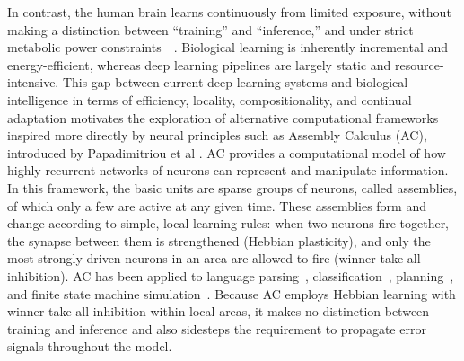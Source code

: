 In contrast, the human brain learns continuously from limited exposure, without making a distinction between “training” and “inference,” and under strict metabolic power constraints~\cite{Lake2015-kj}~\cite{Bi1998-tk}. Biological learning is inherently incremental and energy-efficient, whereas deep learning pipelines are largely static and resource-intensive. This gap between current deep learning systems and biological intelligence in terms of efficiency, locality, compositionality, and continual adaptation motivates the exploration of alternative computational frameworks inspired more directly by neural principles such as Assembly Calculus (AC), introduced by Papadimitriou et al \cite{papadimitriouBrainComputationAssemblies2020}. AC provides a computational model of how highly recurrent networks of neurons can represent and manipulate information. In this framework, the basic units are sparse groups of neurons, called assemblies, of which only a few are active at any given time. These assemblies form and change according to simple, local learning rules: when two neurons fire together, the synapse between them is strengthened (Hebbian plasticity), and only the most strongly driven neurons in an area are allowed to fire (winner-take-all inhibition). AC has been applied to language parsing~\cite{mitropolskyBiologicallyPlausibleParser2021,weiBionicNaturalLanguage2024}, classification~\cite{dabagiaAssembliesNeuronsLearn2022}, planning~\cite{damorePlanningBiologicalNeurons2022}, and finite state machine simulation~\cite{dabagiaComputationSequencesAssemblies2024}. Because AC employs Hebbian learning with winner-take-all inhibition within local areas, it makes no distinction between training and inference and also sidesteps the requirement to propagate error signals throughout the model.

